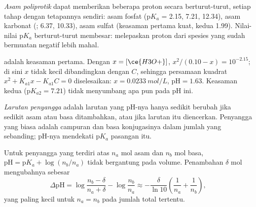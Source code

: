 \begin{definition}\label{def:b1:predominant-reaction:polyprotic}
\emph{Asam poliprotik} dapat memberikan beberapa
proton secara berturut-turut, setiap tahap dengan tetapannya sendiri:
asam fosfat  ($\mathrm{p}K_a$ = 2.15, 7.21, 12.34), asam
karbonat (; 6.37, 10.33), asam sulfat (keasaman pertama kuat,
kedua 1.99). Nilai-nilai $\mathrm{p}K_a$ berturut-turut membesar:
melepaskan proton dari spesies yang sudah bermuatan negatif lebih mahal.
\end{definition}

\begin{example}\label{ex:b1:predominant-reaction:h3po4}
 adalah keasaman pertama. Dengan $x = [\ce{H3O+}]$,
$x^2/(0.10 - x) = 10^{-2.15}$; di sini $x$ tidak kecil dibandingkan
dengan $C$, sehingga persamaan kuadrat $x^2 + K_{a1}x - K_{a1}C = 0$
diselesaikan: $x =
\qty{0.0233}{mol/L}$, $\mathrm{pH} = 1.63$. Keasaman kedua
($\mathrm{p}K_{a2} = 7.21$) tidak menyumbang apa pun pada pH ini.
\end{example}

\begin{definition}\label{def:b1:predominant-reaction:buffer}
\emph{Larutan penyangga} adalah larutan yang
pH-nya hanya sedikit berubah jika sedikit asam atau basa ditambahkan,
atau jika larutan itu diencerkan. Penyangga yang biasa adalah campuran
 dan basa konjugasinya dalam jumlah yang sebanding; pH-nya
mendekati $\mathrm{p}K_a$ pasangan itu.
\end{definition}

\begin{proposition}\label{prop:b1:predominant-reaction:buffer}
Untuk penyangga yang terdiri atas $n_a$ mol asam dan $n_b$ mol basa,
$\mathrm{pH} =
\mathrm{p}K_a + \log(n_b/n_a)$ tidak bergantung pada volume.
Penambahan $\delta$ mol  mengubahnya sebesar
\[
  \Delta\mathrm{pH} = \log\frac{n_b - \delta}{n_a + \delta} - \log\frac{n_b}{n_a}
  \approx -\frac{\delta}{\ln 10}\left(\frac{1}{n_a} + \frac{1}{n_b}\right),
\]
yang paling kecil untuk $n_a = n_b$ pada jumlah total tertentu.
\end{proposition}


